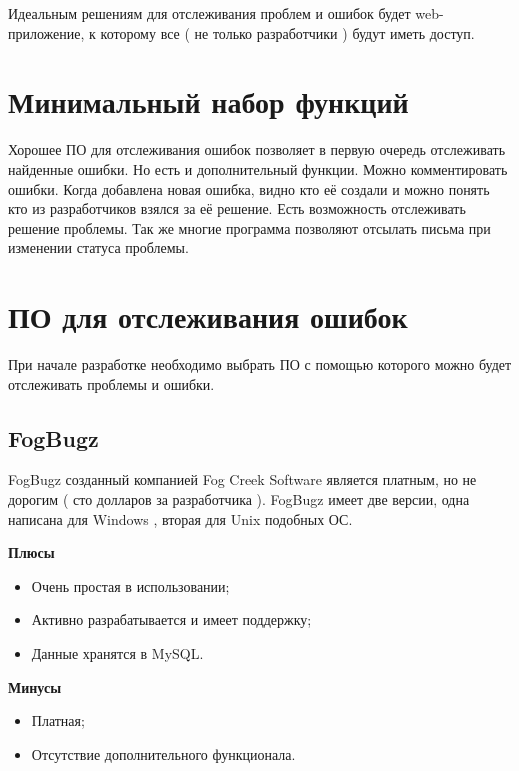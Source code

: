 Идеальным решениям для отслеживания проблем и ошибок будет web-приложение, к которому все ( не только разработчики ) будут иметь доступ. 

\section{ Минимальный набор функций } \label{sect3_15}

Хорошее ПО для отслеживания ошибок позволяет в первую очередь отслеживать найденные ошибки. Но есть и дополнительный функции. Можно комментировать ошибки. Когда добавлена новая ошибка, видно кто её создали  и можно понять кто из разработчиков взялся за её решение. Есть возможность отслеживать решение проблемы. Так же многие программа позволяют отсылать письма при изменении статуса проблемы.

\section{ ПО для отслеживания ошибок } \label{sect3_16}

При начале разработке необходимо выбрать ПО с помощью которого можно будет отслеживать проблемы и ошибки.

\subsection{ FogBugz } \label{sect3_16_1}

FogBugz созданный компанией Fog Creek Software является платным, но не дорогим ( сто долларов за разработчика ). FogBugz имеет две версии, одна написана для Windows , вторая для Unix  подобных ОС.

\textbf{Плюсы}

\begin{itemize}

\item Очень простая в использовании;

\item Активно разрабатывается и имеет поддержку;

\item Данные хранятся в MySQL.

\end{itemize}

\textbf{Минусы}

\begin{itemize}

\item Платная;

\item Отсутствие дополнительного функционала.

\end{itemize}

